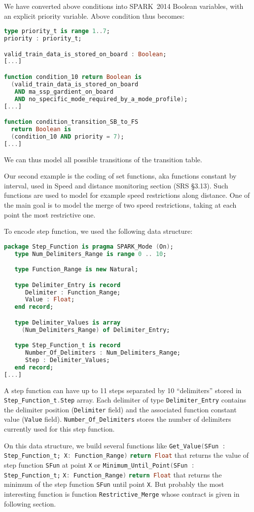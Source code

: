 \documentclass[10pt,a4paper,twocolumn]{article}
\newcommand{\newspark}{SPARK~2014\xspace}
\newcommand{\SPARK}[1]{\lstinline[language=Ada,basicstyle={\footnotesize
      \sffamily},framesep=0pt]$#1$}
\begin{document}
We have converted above conditions into \newspark Boolean variables,
with an explicit priority variable. Above condition thus becomes:
\begin{lstlisting}[language=Ada]
type priority_t is range 1..7;
priority : priority_t;

valid_train_data_is_stored_on_board : Boolean;
[...]

function condition_10 return Boolean is
  (valid_train_data_is_stored_on_board
   AND ma_ssp_gardient_on_board
   AND no_specific_mode_required_by_a_mode_profile);
[...]

function condition_transition_SB_to_FS
  return Boolean is
  (condition_10 AND priority = 7);
[...]
\end{lstlisting}

We can thus model all possible transitions of the transition table.

Our second example is the coding of set functions, aka functions
constant by interval, used in Speed and distance monitoring section
(SRS §3.13). Such functions are used to model for example speed
restrictions along distance. One of the main goal is to model the
merge of two speed restrictions, taking at each point the most
restrictive one.

To encode step function, we used the following data structure:
\begin{lstlisting}[language=Ada]
package Step_Function is pragma SPARK_Mode (On);
   type Num_Delimiters_Range is range 0 .. 10;

   type Function_Range is new Natural;

   type Delimiter_Entry is record
      Delimiter : Function_Range;
      Value : Float;
   end record;

   type Delimiter_Values is array
     (Num_Delimiters_Range) of Delimiter_Entry;

   type Step_Function_t is record
      Number_Of_Delimiters : Num_Delimiters_Range;
      Step : Delimiter_Values;
   end record;
[...]
\end{lstlisting}

A step function can have up to 11 steps separated by 10 ``delimiters''
stored in \SPARK{Step_Function_t.Step} array. Each delimiter of type
\SPARK{Delimiter_Entry} contains the delimiter position
(\SPARK{Delimiter} field) and the associated function constant value
(\SPARK{Value} field). \SPARK{Number_Of_Delimiters} stores the number
of delimiters currently used for this step function.

On this data structure, we build several functions like
\SPARK{Get_Value(SFun : Step_Function_t; X: Function_Range)}
\SPARK{return Float} that returns the value of step function
\SPARK{SFun} at point \SPARK{X} or \SPARK{Minimum_Until_Point(SFun :
  Step_Function_t;} \SPARK{X: Function_Range)} \SPARK{return Float}
that returns the minimum of the step function \SPARK{SFun} until point
\SPARK{X}. But probably the most interesting function is function
\SPARK{Restrictive_Merge} whose contract is given in following
section.
\end{document}
